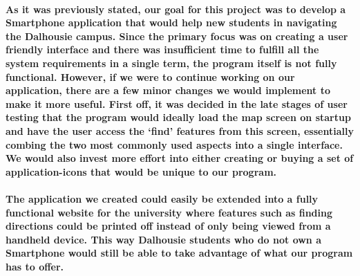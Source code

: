 \documentclass{report}
\begin{document}
    \paragraph{As it was previously stated, our goal for this project was to
    develop a Smartphone application that would help new students in navigating the
    Dalhousie campus. Since the primary focus was on creating a user friendly
    interface and there was insufficient time to fulfill all the system requirements
    in a single term, the program itself is not fully functional. However, if we
    were to continue working on our application, there are a few minor changes we
    would implement to make it more useful. First off, it was decided in the late
    stages of user testing that the program would ideally load the map screen on
    startup and have the user access the ‘find’ features from this screen,
    essentially combing the two most commonly used aspects into a single interface.
    We would also invest more effort into either creating or buying a set of
    application-icons that would be unique to our program.}
    \paragraph{The application we created could easily be extended into a fully
    functional website for the university where features such as finding directions
    could be printed off instead of only being viewed from a handheld device. This
    way Dalhousie students who do not own a Smartphone would still be able to take
    advantage of what our program has to offer.}
\nocite{*}
{}

\end{document}
